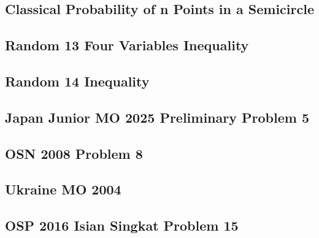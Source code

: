 \subsection{Classical Probability of n Points in a Semicircle}


\subsection{Random 13 Four Variables Inequality}


\subsection{Random 14 Inequality}


\subsection{Japan Junior MO 2025 Preliminary Problem 5}


\subsection{OSN 2008 Problem 8}


\subsection{Ukraine MO 2004}


\subsection{OSP 2016 Isian Singkat Problem 15}

